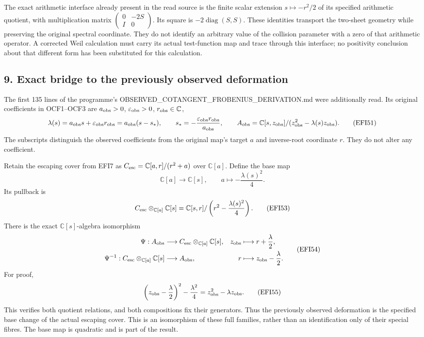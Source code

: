 \documentclass[
  10pt,
  a4paper,
]{article}
\begin{document}
The exact arithmetic interface already present in the read source is the
finite scalar extension \(s\mapsto-r^2/2\) of its specified arithmetic
quotient, with multiplication matrix
\(\begin{pmatrix}0&-2S\\I&0\end{pmatrix}\). Its square is
\(-2\operatorname{diag}(S,S)\). These identities transport the two-sheet
geometry while preserving the original spectral coordinate. They do not
identify an arbitrary value of the collision parameter with a zero of
that arithmetic operator. A corrected Weil calculation must carry its
actual test-function map and trace through this interface; no positivity
conclusion about that different form has been substituted for this
calculation.

\subsection{9. Exact bridge to the previously observed
deformation}\label{exact-bridge-to-the-previously-observed-deformation}

The first 135 lines of the programme's
OBSERVED\_COTANGENT\_FROBENIUS\_DERIVATION.md were additionally read.
Its original coefficients in OCF1--OCF3 are \(a_{\rm obs}>0\),
\(\varepsilon_{\rm obs}>0\), \(r_{\rm obs}\in\mathbb C\), \[
\lambda(s)=a_{\rm obs}s+\varepsilon_{\rm obs}r_{\rm obs}
=a_{\rm obs}(s-s_*),\qquad
s_*=-\frac{\varepsilon_{\rm obs}r_{\rm obs}}{a_{\rm obs}},
\qquad
A_{\rm obs}=\mathbb C[s,z_{\rm obs}]
/(z_{\rm obs}^2-\lambda(s)z_{\rm obs}).
\tag{EFI51}
\] The subscripts distinguish the observed coefficients from the
original map's target \(a\) and inverse-root coordinate \(r\). They do
not alter any coefficient.

Retain the escaping cover from EFI7 as
\(C_{\rm esc}=\mathbb C[a,r]/(r^2+a)\) over \(\mathbb C[a]\). Define the
base map \[
\mathbb C[a]\longrightarrow\mathbb C[s],\qquad
a\longmapsto-\frac{\lambda(s)^2}{4}.
\tag{EFI52}
\] Its pullback is \[
C_{\rm esc}\otimes_{\mathbb C[a]}\mathbb C[s]
=\mathbb C[s,r]/\left(r^2-\frac{\lambda(s)^2}{4}\right).
\tag{EFI53}
\] There is the exact \(\mathbb C[s]\)-algebra isomorphism \[
\begin{aligned}
\Psi:A_{\rm obs}&\longrightarrow
C_{\rm esc}\otimes_{\mathbb C[a]}\mathbb C[s],
&
z_{\rm obs}&\longmapsto r+\frac{\lambda}{2},\\
\Psi^{-1}:C_{\rm esc}\otimes_{\mathbb C[a]}\mathbb C[s]
&\longrightarrow A_{\rm obs},
&
r&\longmapsto z_{\rm obs}-\frac{\lambda}{2}.
\end{aligned}
\tag{EFI54}
\] For proof, \[
\left(z_{\rm obs}-\frac\lambda2\right)^2-\frac{\lambda^2}{4}
=z_{\rm obs}^2-\lambda z_{\rm obs}.
\tag{EFI55}
\] This verifies both quotient relations, and both compositions fix
their generators. Thus the previously observed deformation is the
specified base change of the actual escaping cover. This is an
isomorphism of these full families, rather than an identification only
of their special fibres. The base map is quadratic and is part of the
result.
\end{document}
